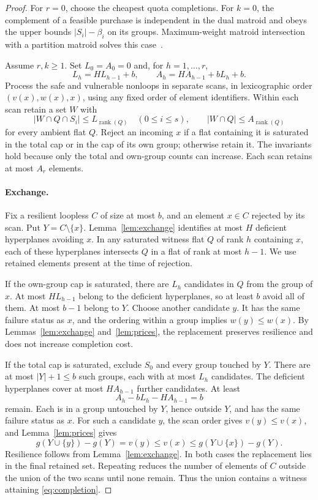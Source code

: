 \documentclass[11pt]{article}
\theoremstyle{definition}
\theoremstyle{remark}\newtheorem{remark}[theorem]{Remark}
\DeclareMathOperator{\rk}{rank}
\begin{document}
\begin{proof}
For $r=0$, choose the cheapest quota completions. For $k=0$,
the complement of a feasible purchase is independent in the dual
matroid and obeys the upper bounds $|S_i|-\beta_i$ on its groups.
Maximum-weight matroid intersection with a partition matroid
solves this case~\cite{Lawler,Oxley}.

Assume $r,k\ge1$. Set $L_0=A_0=0$ and, for $h=1,\ldots,r$,
\[
 L_h=HL_{h-1}+b,\qquad A_h=HA_{h-1}+bL_h+b.
\]
Process the safe and vulnerable nonloops in separate scans, in
lexicographic order $(v(x),w(x),x)$, using any fixed order of
element identifiers. Within each scan retain a set $W$ with
\begin{equation}\label{eq:flat-caps}
 |W\cap Q\cap S_i|\le L_{\rk(Q)}\quad(0\le i\le s),
 \qquad |W\cap Q|\le A_{\rk(Q)}
\end{equation}
for every ambient flat $Q$. Reject an incoming $x$ if a flat
containing it is saturated in the total cap or in the cap of its
own group; otherwise retain it. The invariants hold because only
the total and own-group counts can increase. Each scan retains
at most $A_r$ elements.

\paragraph{Exchange.}
Fix a resilient loopless $C$ of size at most $b$, and an element
$x\in C$ rejected by its scan. Put $Y=C\setminus\{x\}$.
Lemma~\ref{lem:exchange} identifies at most $H$ deficient
hyperplanes avoiding $x$. In any saturated witness flat $Q$
of rank $h$ containing $x$, each of these hyperplanes intersects
$Q$ in a flat of rank at most $h-1$. We use retained elements
present at the time of rejection.

If the own-group cap is saturated, there are $L_h$ candidates
in $Q$ from the group of $x$. At most $HL_{h-1}$ belong to
the deficient hyperplanes, so at least $b$ avoid all of them.
At most $b-1$ belong to $Y$. Choose another candidate $y$.
It has the same failure status as $x$, and the ordering within
a group implies $w(y)\le w(x)$. By Lemmas~\ref{lem:exchange}
and~\ref{lem:prices}, the replacement preserves resilience and
does not increase completion cost.

If the total cap is saturated, exclude $S_0$ and every group
touched by $Y$. There are at most $|Y|+1\le b$ such groups,
each with at most $L_h$ candidates. The deficient hyperplanes
cover at most $HA_{h-1}$ further candidates. At least
\[
 A_h-bL_h-HA_{h-1}=b
\]
remain. Each is in a group untouched by $Y$, hence outside $Y$,
and has the same failure status as $x$. For such a candidate $y$,
the scan order gives $v(y)\le v(x)$, and Lemma~\ref{lem:prices} gives
\[
 g(Y\cup\{y\})-g(Y)=v(y)\le v(x)
 \le g(Y\cup\{x\})-g(Y).
\]
Resilience follows from Lemma~\ref{lem:exchange}. In both cases
the replacement lies in the final retained set. Repeating reduces
the number of elements of $C$ outside the union of the two scans
until none remain. Thus the union contains a witness attaining
\eqref{eq:completion}.


\end{proof}
\end{document}

